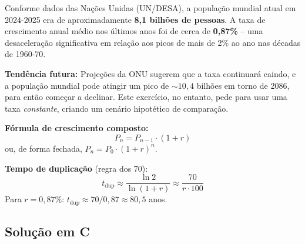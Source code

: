 \documentclass[12pt,a4paper]{article}
\begin{document}
\begin{pesquisa}
Conforme dados das Nações Unidas (UN/DESA), a população mundial atual em 2024-2025
era de aproximadamente \textbf{8,1 bilhões de pessoas}. A taxa de crescimento anual
médio nos últimos anos foi de cerca de \textbf{0,87\%} -- uma desaceleração significativa
em relação aos picos de mais de 2\% ao ano nas décadas de 1960-70.

\textbf{Tendência futura:} Projeções da ONU sugerem que a taxa continuará caindo, e
a população mundial pode atingir um pico de \(\sim 10{,}4\) bilhões em torno de 2086,
para então começar a declinar. Este exercício, no entanto, pede para usar uma taxa
\textit{constante}, criando um cenário hipotético de comparação.

\textbf{Fórmula de crescimento composto:}
\[
  P_n = P_{n-1} \cdot (1 + r)
\]
ou, de forma fechada, $P_n = P_0 \cdot (1+r)^n$.

\textbf{Tempo de duplicação} (regra dos 70):
\[
  t_{\text{dup}} \approx \frac{\ln 2}{\ln(1+r)} \approx \frac{70}{r \cdot 100}
\]
Para $r = 0{,}87\%$: $t_{\text{dup}} \approx 70 / 0{,}87 \approx 80{,}5$ anos.
\end{pesquisa}

\subsection*{Solução em C}
\end{document}
